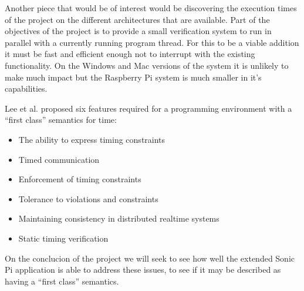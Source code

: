 \documentclass[11pt]{scrartcl}
\begin{document}
Another piece that would be of interest would be discovering the execution 
times of the project on the different architectures that are available. Part 
of the objectives of the project is to provide a small verification system to 
run in parallel with a currently running program thread. For this to be a 
viable addition it must be fast and efficient enough not to interrupt with the 
existing functionality. On the Windows and Mac versions of the system it is 
unlikely to make much impact but the Raspberry Pi system is much smaller in 
it's capabilities.

Lee et al. \cite{LDW87} proposed six features required for a programming environment 
with a ``first class'' semantics for time:

\begin{itemize}
	\item The ability to express timing constraints
	\item Timed communication
	\item Enforcement of timing constraints
	\item Tolerance to violations and constraints
	\item Maintaining consistency in distributed realtime systems
	\item Static timing verification
\end{itemize}

On the conclucion of the project we will seek to see how well the extended Sonic 
Pi application is able to address these issues, to see if it may be described as 
having a ``first class'' semantics.

\end{document}
